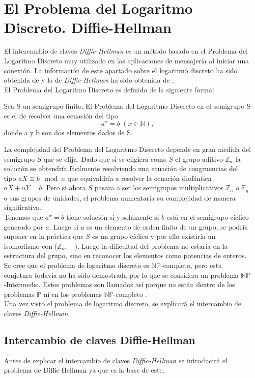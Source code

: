\section{El Problema del Logaritmo Discreto. Diffie-Hellman}
El intercambio de claves \emph{Diffie-Hellman} es un método basado en el Problema del Logaritmo Discreto muy utilizado en las aplicaciones de mensajería al iniciar una conexión. La información de este apartado sobre el logaritmo discreto ha sido obtenida de \cite{angelRiosMateos} y la de \emph{Diffie-Hellman} ha sido obtenida de \cite{En2011}.\\
El Problema del Logaritmo Discreto es definido de la siguiente forma:
\begin{definicion}
	Sea S un semigrupo finito. El Problema del Logaritmo Discreto en el semigrupo S es el de resolver una ecuación del tipo\\
		$$
			a^x\!=b\;(x\in \mathbb{N}),
		$$
	donde a y b son dos elementos dados de S.
\end{definicion}

La complejidad del Problema del Logaritmo Discreto depende en gran medida del semigrupo $S$ que se elija.
Dado que si se eligiera como $S$ el grupo aditivo $\mathbb{Z}_n$ la solución se obtendría fácilmente resolviendo una ecuación de congruencias del tipo $aX \equiv b \mod n$ que equivaldría a resolver la ecuación diofántica $aX + nY = b$. Pero si ahora $S$ pasara a ser los semigrupos multiplicativos $\mathbb{Z}_n$ o $\mathbb{F}_q$ o sus grupos de unidades, el problema aumentaría su complejidad de manera significativa.\\
Tenemos que $a^x = b$ tiene solución si y solamente si $b$ está en el semigrupo cíclico generado por $a$. Luego si $a$ es un elemento de orden finito de un grupo, se podría suponer en la práctica que $S$ es un grupo cíclico y por ello existiría un isomorfismo con ($\mathbb{Z}_n$, $+$). Luego la dificultad del problema no estaría en la estructura del grupo, sino en reconocer los elementos como potencias de enteros.\\
Se cree que el problema de logaritmo discreto es $\mathbb{NP}$-completo, pero esta conjetura todavía no ha sido demostrada por lo que se considera un problema $\mathbb{NP}$-Intermedio. Estos problemas son llamados así porque no están dentro de los problemas $\mathbb{P}$ ni en los problemas $\mathbb{NP}$-completo \cite{NP-intermedio}.\\
Una vez visto el problema de logaritmo discreto, se explicará el intercambio de claves \emph{Diffie-Hellman}.
\subsection{Intercambio de claves Diffie-Hellman}
Antes de explicar el intercambio de claves \emph{Diffie-Hellman} se introducirá el problema de Diffie-Hellman ya que es la base de este.\\

